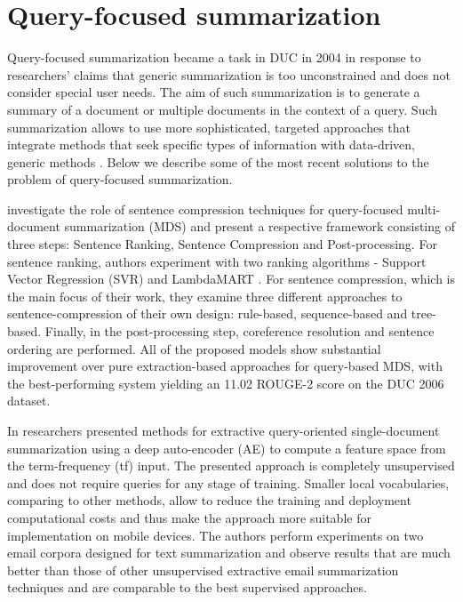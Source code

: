 \documentclass[11pt,a4paper,onecolumn]{article}
\begin{document}
\section{Query-focused summarization}
Query-focused summarization became a task in DUC in 2004 in response to researchers' claims that generic summarization is too unconstrained and does not consider special user needs.
The aim of such summarization is to generate a summary of a document or multiple documents in the context of a query.
Such summarization allows to use more sophisticated, targeted approaches that integrate methods that seek specific types of information with data-driven, generic methods \cite{nenkova2011automatic}.
Below we describe some of the most recent solutions to the problem of query-focused summarization.

\cite{wang2016sentence} investigate the role of sentence compression techniques for query-focused multi-document summarization (MDS) and present a respective framework consisting of three steps: Sentence Ranking, Sentence Compression and Post-processing.
For sentence ranking, authors experiment with two ranking algorithms - Support Vector Regression (SVR) \cite{mozer1997} and LambdaMART \cite{burges2007learning}.
For sentence compression, which is the main focus of their work, they examine three different approaches to sentence-compression of their own design: rule-based, sequence-based and tree-based.
Finally, in the post-processing step, coreference resolution and sentence ordering are performed.
All of the proposed models show substantial improvement over pure extraction-based approaches for query-based MDS, with the best-performing system yielding an 11.02 ROUGE-2 score on the DUC 2006 dataset.

In \cite{yousefi2017text} researchers presented methods for extractive query-oriented single-document summarization using a deep auto-encoder (AE) to compute a feature space from the term-frequency (tf) input.
The presented approach is completely unsupervised and does not require queries for any stage of training.
Smaller local vocabularies, comparing to other methods, allow to reduce the training and deployment computational costs and thus make the approach more suitable for implementation on mobile devices.
The authors perform experiments on two email corpora designed for text summarization and observe results that are much better than those of other unsupervised extractive email summarization techniques and are comparable to the best supervised approaches.
\end{document}
